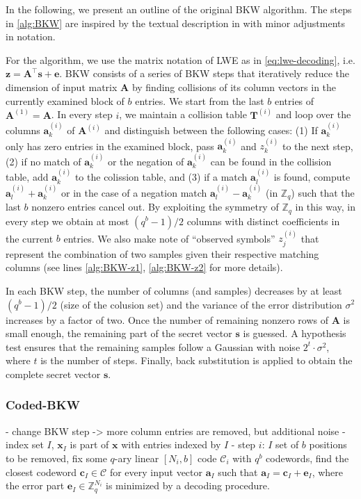 In the following, we present an outline of the original BKW algorithm. The steps in \cref{alg:BKW} are inspired by the textual description in \cite{GJS15} with minor adjustments in notation. 

For the algorithm, we use the matrix notation of LWE as in \cref{eq:lwe-decoding}, i.e. $\mathbf{z} = \mathbf{A}^\intercal \mathbf{s} + \mathbf{e}$. BKW consists of a series of BKW steps that iteratively reduce the dimension of input matrix $\mathbf{A}$ by finding collisions of its column vectors in the currently examined block of $b$ entries. We start from the last $b$ entries of $\mathbf{A}^{(1)} = \mathbf{A}$. In every step $i$, we maintain a collision table $\mathbf{T}^{(i)}$ and loop over the columns $\mathbf{a}_k^{(i)}$ of $\mathbf{A}^{(i)}$ and distinguish between the following cases: (1) If $\mathbf{a}_k^{(i)}$ only has zero entries in the examined block, pass $\mathbf{a}_k^{(i)}$ and $z_k^{(i)}$ to the next step, (2) if no match of $\mathbf{a}_k^{(i)}$ or the negation of $\mathbf{a}_k^{(i)}$ can be found in the collision table, add $\mathbf{a}_k^{(i)}$ to the colission table, and (3) if a match $\mathbf{a}_l^{(i)}$ is found, compute $\mathbf{a}_l^{(i)} + \mathbf{a}_k^{(i)}$ or in the case of a negation match $\mathbf{a}_l^{(i)} - \mathbf{a}_k^{(i)}$ (in $\mathbb{Z}_q$) such that the last $b$ nonzero entries cancel out. By exploiting the symmetry of $\mathbb{Z}_q$ in this way, in every step we obtain at most $(q^b - 1)/2$ columns with distinct coefficients in the current $b$ entries. We also make note of ``observed symbols'' $z_j^{(i)}$ that represent the combination of two samples given their respective matching columns (see lines \ref{alg:BKW-z1}, \ref{alg:BKW-z2} for more details).

In each BKW step, the number of columns (and samples) decreases by at least $(q^b - 1)/2$ (size of the colusion set) and the variance of the error distribution $\sigma^2$ increases by a factor of two. Once the number of remaining nonzero rows of $\mathbf{A}$ is small enough, the remaining part of the secret vector $\mathbf{s}$ is guessed. A hypothesis test ensures that the remaining samples follow a Gaussian with noise $2^t\cdot \sigma^2$, where $t$ is the number of steps. Finally, back substitution is applied to obtain the complete secret vector $\mathbf{s}$. %

\subsubsection*{Coded-BKW \cite{GJS15}}
- change BKW step -> more column entries are removed, but additional noise
- index set $I$, $\mathbf{x}_I$ is part of $\mathbf{x}$ with entries indexed by $I$
- step $i$: $I$ set of $b$ positions to be removed, fix some $q$-ary linear $\left[N_i, b\right]$ code $\mathcal{C}_i$ with $q^b$ codewords, find the closest codeword $\mathbf{c}_I \in \mathcal{C}$ for every input vector $\mathbf{a}_I$ such that $\mathbf{a}_I = \mathbf{c}_I + \mathbf{e}_I$, where the error part $\mathbf{e}_I \in \mathbb{Z}_q^{N_i}$ is minimized by a decoding procedure.

